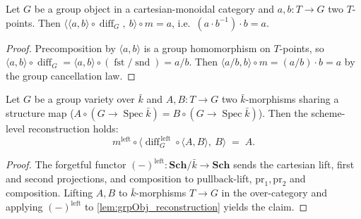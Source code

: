 \begin{lemma}\leanok
  \label{lem:grpObj_reconstruction}
  Let \(G\) be a group object in a cartesian-monoidal category and \(a, b \colon T \to G\)
  two \(T\)-points. Then
  \(\bigl\langle \langle a, b\rangle \circ \operatorname{diff}_G,\ b \bigr\rangle \circ m
  = a\), i.e.\ \((a \cdot b^{-1}) \cdot b = a\).
\end{lemma}
\begin{proof}\leanok
  Precomposition by \(\langle a, b\rangle\) is a group homomorphism on \(T\)-points, so
  \(\langle a, b\rangle \circ \operatorname{diff}_G = \langle a, b\rangle \circ
  (\operatorname{fst} / \operatorname{snd}) = a / b\). Then \(\langle a/b, b\rangle \circ m
  = (a/b) \cdot b = a\) by the group cancellation law.
\end{proof}

\begin{lemma}\leanok
  \label{lem:scheme_reconstruction}
  Let \(G\) be a group variety over \(\bar k\) and \(A, B \colon T \to G\) two
  \(\bar k\)-morphisms sharing a structure map (\(A \circ (G \to \operatorname{Spec}\bar k)
  = B \circ (G \to \operatorname{Spec}\bar k)\)). Then the scheme-level reconstruction holds:
  \[
    m^{\mathrm{left}} \circ \bigl\langle
      \operatorname{diff}_G^{\,\mathrm{left}} \circ \langle A, B\rangle,\ B
    \bigr\rangle \;=\; A .
  \]
\end{lemma}
\begin{proof}\leanok
  The forgetful functor \((-)^{\mathrm{left}} \colon \mathbf{Sch}/\bar k \to \mathbf{Sch}\)
  sends the cartesian lift, first and second projections, and composition to
  \(\mathrm{pullback}\)-lift, \(\mathrm{pr}_1, \mathrm{pr}_2\) and composition. Lifting \(A,
  B\) to \(\bar k\)-morphisms \(T \to G\) in the over-category and applying
  \((-)^{\mathrm{left}}\) to \cref{lem:grpObj_reconstruction} yields the claim.
\end{proof}

